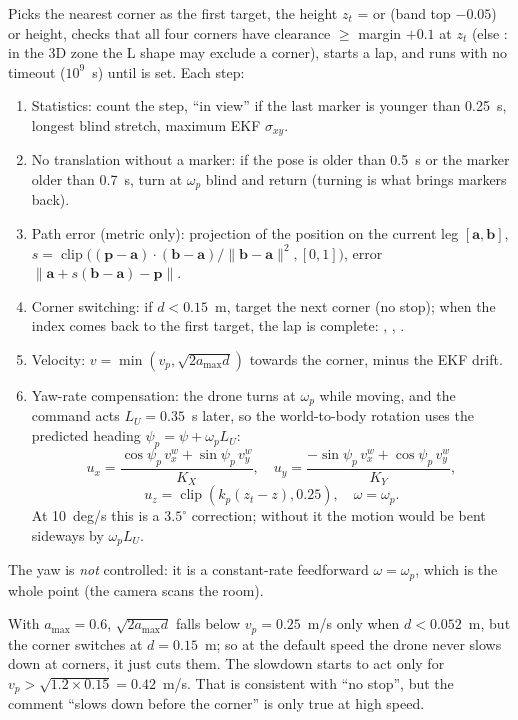 Picks the nearest corner as the first target, the height
$z_t$ =  or (band top $-0.05$) or  height, checks that all four corners have clearance
$\ge$ margin $+0.1$ at $z_t$ (else : in the 3D zone the L shape may exclude a corner), starts a lap,
and runs  with no timeout ($10^9$~s) until  is set. Each step:
\begin{enumerate}[nosep]
  \item Statistics: count the step, ``in view'' if the last marker is younger than 0.25~s, longest blind
        stretch, maximum EKF $\sigma_{xy}$.
  \item No translation without a marker: if the pose is older than 0.5~s or the marker older than 0.7~s, turn
        at $\omega_p$ blind and return (turning is what brings markers back).
  \item Path error (metric only): projection of the position on the current leg $[\mathbf a, \mathbf b]$,
        $s = \operatorname{clip}\big((\mathbf p - \mathbf a)\cdot(\mathbf b - \mathbf a)/\lVert\mathbf b -
        \mathbf a\rVert^2, [0,1]\big)$, error $\lVert \mathbf a + s(\mathbf b - \mathbf a) - \mathbf p\rVert$.
  \item Corner switching: if $d < 0.15$~m, target the next corner (no stop); when the index comes back to the
        first target, the lap is complete: , , .
  \item Velocity: $v = \min(v_p, \sqrt{2a_{\max} d})$ towards the corner, minus the EKF drift.
  \item Yaw-rate compensation: the drone turns at $\omega_p$ while moving, and the command acts $L_U = 0.35$~s
        later, so the world-to-body rotation uses the predicted heading $\psi_p = \psi + \omega_p L_U$:
$$
u_x = \frac{\cos\psi_p\,v^w_x + \sin\psi_p\,v^w_y}{K_X},\quad
u_y = \frac{-\sin\psi_p\,v^w_x + \cos\psi_p\,v^w_y}{K_Y},
$$
$$
u_z = \operatorname{clip}(k_p(z_t-z), 0.25),\quad \omega = \omega_p .
$$
        At 10~deg/s this is a $3.5^\circ$ correction; without it the motion would be bent sideways by
        $\omega_p L_U$.
\end{enumerate}
The yaw is \emph{not} controlled: it is a constant-rate feedforward $\omega = \omega_p$, which is the whole point
(the camera scans the room).

\begin{intuition}
With $a_{\max} = 0.6$, $\sqrt{2a_{\max}d}$ falls below $v_p = 0.25$~m/s only when $d < 0.052$~m, but the corner
switches at $d = 0.15$~m; so at the default speed the drone never slows down at corners, it just cuts them. The
slowdown starts to act only for $v_p > \sqrt{1.2 \times 0.15} = 0.42$~m/s. That is consistent with ``no stop'',
but the comment ``slows down before the corner'' is only true at high speed.
\end{intuition}

